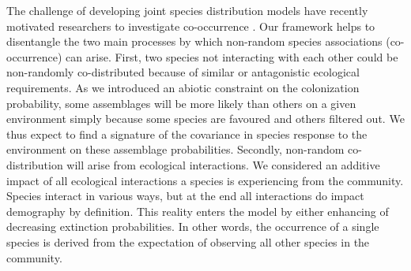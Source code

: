 The challenge of developing joint species distribution models \citep{Pollock2014Understanding,Pellissier2013Combining} have recently motivated researchers to investigate co-occurrence \citep{Araujo2014Geographic,Veech2013Probabilistic}.
Our framework helps to disentangle the two main processes by which non-random species associations (co-occurrence) can arise. First, two species not interacting with each other could be non-randomly co-distributed because of similar or antagonistic ecological requirements. As we introduced an abiotic constraint on the colonization probability, some assemblages will be more likely than others on a given environment simply because some species are favoured and others filtered out. We thus expect to find a signature of the covariance in species response to the environment on these assemblage probabilities. Secondly, non-random co-distribution will arise from ecological interactions. We considered an additive impact of all ecological interactions a species is experiencing from the community. Species interact in various ways, but at the end all interactions do impact demography by definition. This reality enters the model by either enhancing of decreasing extinction probabilities. In other words, the occurrence of a single species is derived from the expectation of observing all other species in the community.


